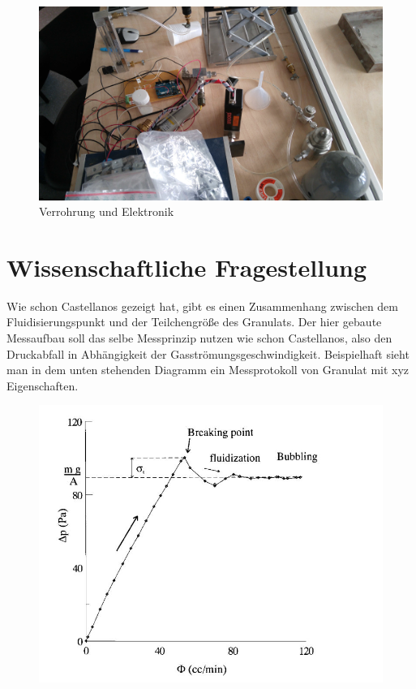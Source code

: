 \begin{figure}[h]
	\begin{center}
		\includegraphics[scale=0.055]{Kabel_Rohrleitungen_alt.jpg}
		\caption{Verrohrung und Elektronik}
	\end{center}
\end{figure}


\section{Wissenschaftliche Fragestellung}

Wie schon Castellanos gezeigt hat, gibt es einen Zusammenhang zwischen dem Fluidisierungspunkt und der Teilchengröße des Granulats. Der hier gebaute Messaufbau soll das selbe Messprinzip nutzen wie schon Castellanos, also den Druckabfall in Abhängigkeit der Gasströmungsgeschwindigkeit. Beispielhaft sieht man in dem unten stehenden Diagramm ein Messprotokoll von Granulat mit xyz Eigenschaften.

\begin{figure}[h]
	\begin{center}
		\includegraphics[scale=0.5]{Castellanos_Diagramm.jpg}
		\caption{\cite{Castellanos2000}}
	\end{center}
\end{figure}

